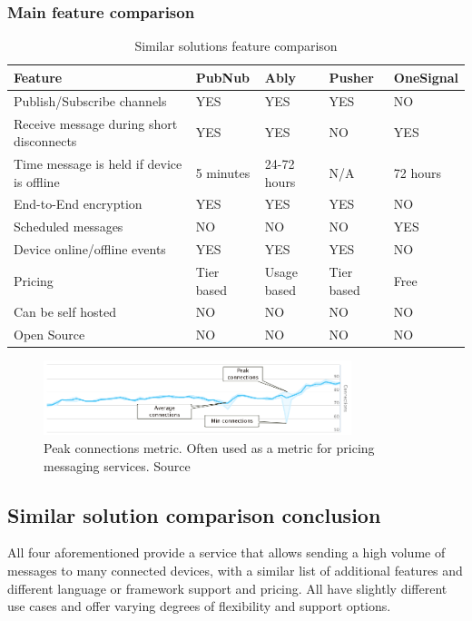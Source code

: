 \subsubsection*{Main feature comparison}

\begin{table}[!ht]
\begin{center}
\begin{tabular}{|l|l|l|l|l|}
\hline
\textbf{Feature} & \textbf{PubNub} & \textbf{Ably} & \textbf{Pusher} & \textbf{OneSignal} \\
\hline
Publish/Subscribe channels & YES & YES & YES & NO \\
\hline
Receive message during short disconnects & YES & YES & NO & YES \\
\hline
Time message is held if device is offline & 5 minutes & 24-72 hours & N/A & 72 hours \\
\hline
End-to-End encryption & YES & YES & YES & NO \\
\hline
Scheduled messages & NO & NO & NO & YES \\
\hline
Device online/offline events & YES & YES & YES & NO \\
\hline
Pricing & Tier based & Usage based & Tier based & Free \\
\hline
Can be self hosted & NO & NO & NO & NO \\
\hline
Open Source & NO & NO & NO & NO \\
\hline
\end{tabular}
\end{center}
\caption{Similar solutions feature comparison}
\label{tab:ex_db}
\end{table}

\begin{figure}[!ht]
	\centering
	\includegraphics[width=0.8\textwidth]{figures/02_analysis/peak-conns}
    \caption{Peak connections metric. Often used as a metric for pricing messaging services. Source\cite{ably-peak}}
    \label{fig:peak-conns}
\end{figure}

\subsection{Similar solution comparison conclusion}
All four aforementioned provide a service that allows sending a high volume of messages to many connected devices, with a similar list of additional features and different language or framework support and pricing. All have slightly different use cases and offer varying degrees of flexibility and support options.

